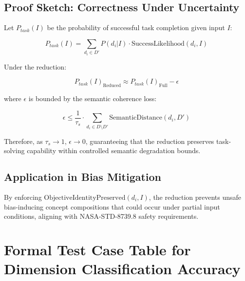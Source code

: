 \documentclass[12pt,a4paper]{article}
\begin{document}
\begin{appendices}
\subsection{Proof Sketch: Correctness Under Uncertainty}

Let $P_{task}(I)$ be the probability of successful task completion given input $I$:

\begin{equation}
P_{task}(I) = \sum_{d_i \in D'} P(d_i|I) \cdot \text{SuccessLikelihood}(d_i, I)
\end{equation}

Under the reduction:

\begin{equation}
P_{task}(I)_{\text{Reduced}} \approx P_{task}(I)_{\text{Full}} - \epsilon
\end{equation}

where $\epsilon$ is bounded by the semantic coherence loss:

\begin{equation}
\epsilon \leq \frac{1}{\tau_s} \cdot \sum_{d_i \in D \setminus D'} \text{SemanticDistance}(d_i, D')
\end{equation}

Therefore, as $\tau_s \to 1$, $\epsilon \to 0$, guaranteeing that the reduction preserves task-solving capability within controlled semantic degradation bounds.

\subsection{Application in Bias Mitigation}

By enforcing $\text{ObjectiveIdentityPreserved}(d_i, I)$, the reduction prevents unsafe bias-inducing concept compositions that could occur under partial input conditions, aligning with NASA-STD-8739.8 safety requirements.

\clearpage

\section{Formal Test Case Table for Dimension Classification Accuracy}


\end{appendices}
\end{document}
